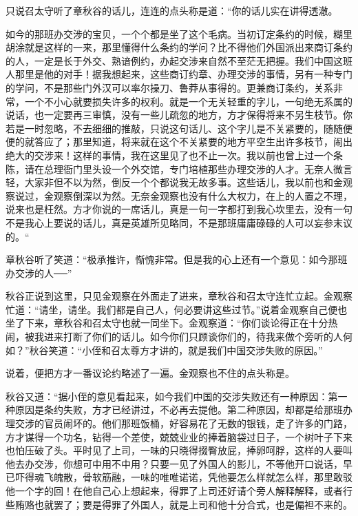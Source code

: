 \documentclass[12pt,UTF8]{ctexbook}
\begin{document}
{{{只说召太守听了章秋谷的话儿，连连的点头称是道：“你的话儿实在讲得透澈。

如今的那班办交涉的宝贝，一个个都是坐了这个毛病。当初订定条约的时候，糊里胡涂就是这样的一来，那里懂得什么条约的学问？比不得他们外国派出来商订条约的人，一定是长于外交、熟谙例约，办起交涉来自然不至茫无把握。我们中国这班人那里是他的对手！据我想起来，这些商订约章、办理交涉的事情，另有一种专门的学问，不是那些门外汉可以率尔操刀、鲁莽从事得的。更兼商订条约，关系非常，一个不小心就要损失许多的权利。就是一个无关轻重的字儿，一句绝无系属的说话，也一定要再三审慎，没有一些儿疏忽的地方，方才保得将来不另生枝节。你若是一时忽略，不去细细的推敲，只说这句话儿、这个字儿是不关紧要的，随随便便的就答应了；那里知道，将来就在这个不关紧要的地方平空生出许多枝节，闹出绝大的交涉来！这样的事情，我在这里见了也不止一次。我以前也曾上过一个条陈，请在总理衙门里头设一个外交馆，专门培植那些办理交涉的人才。无奈人微言轻，大家非但不以为然，倒反一个个都说我无故多事。这些话儿，我以前也和金观察说过，金观察倒深以为然。无奈金观察也没有什么大权力，在上的人置之不理，说来也是枉然。方才你说的一席话儿，真是一句一字都打到我心坎里去，没有一句不是我心上要说的话儿，真是英雄所见略同，不是那班庸庸碌碌的人可以妄参末议的。“

章秋谷听了笑道：“极承推许，惭愧非常。但是我的心上还有一个意见：如今那班办交涉的人──”

秋谷正说到这里，只见金观察在外面走了进来，章秋谷和召太守连忙立起。金观察忙道：“请坐，请坐。我们都是自己人，何必要讲这些过节。”说着金观察自己便也坐了下来，章秋谷和召太守也就一同坐下。金观察道：“你们谈论得正在十分热闹，被我进来打断了你们的话儿。如今你们只顾谈你们的，待我来做个旁听的人何如？”秋谷笑道：“小侄和召太尊方才讲的，就是我们中国交涉失败的原因。”

说着，便把方才一番议论约略述了一遍。金观察也不住的点头称是。

秋谷又道：“据小侄的意见看起来，如今我们中国的交涉失败还有一种原因：第一种原因是条约失败，方才已经讲过，不必再去提他。第二种原因，却都是给那班办理交涉的官员闹坏的。他们那班饭桶，好容易花了无数的银钱，走了许多的门路，方才谋得一个功名，钻得一个差使，兢兢业业的捧着脑袋过日子，一个树叶子下来也怕压破了头。平时见了上司，一味的只晓得掇臀放屁，捧卵呵脬，这样的人要叫他去办交涉，你想可中用不中用？只要一见了外国人的影儿，不等他开口说话，早已吓得魂飞魄散，骨软筋融，一味的唯唯诺诺，凭他要怎么样就怎么样，那里敢驳他一个字的回！在他自己心上想起来，得罪了上司还好请个旁人解释解释，或者行些贿赂也就罢了；要是得罪了外国人，就是上司和他十分合式，也是偏袒不来的。

}}}
\end{document}
